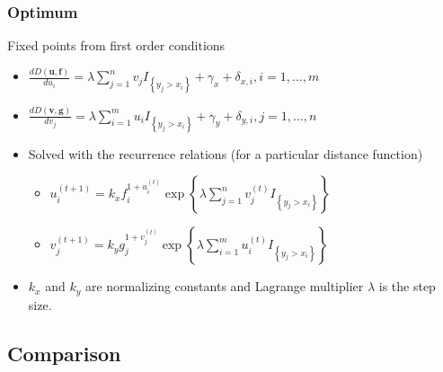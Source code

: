 \documentclass{beamer}
\begin{document}

\begin{frame}
\frametitle{Optimum}

Fixed points from first order conditions
\begin{itemize}
    \item $\frac{d D(\mathbf{u},\mathbf{f})}{d u_i} = \lambda \sum_{j = 1}^{n} v_j I_{\left\{ y_j > x_i \right\}} + \gamma_x + \delta_{x,i},
    i = 1, \dots, m$
    \item $\frac{d D(\mathbf{v},\mathbf{g})}{d v_j} = \lambda \sum_{i = 1}^{m} u_i I_{\left\{ y_j > x_i \right\}} + \gamma_y + \delta_{y,i},
    j = 1, \dots, n$
    \item Solved with the recurrence relations (for a particular distance function)
    \begin{itemize}
        \item $u_i^{(t+1)} = k_x f_i ^{1 + u_i^{(t)}}
                \exp{ \left\{ \lambda \sum_{j = 1}^{n} v_j^{(t)} I_{\left\{ y_j > x_i \right\}} \right\} }$
        \item $v_j^{(t+1)} = k_y g_j ^{1 + v_j^{(t)}}
                \exp{ \left\{ \lambda \sum_{i = 1}^{m} u_i^{(t)} I_{\left\{ y_j > x_i \right\}}  \right\} }$
    \end{itemize}
    \item $k_x$ and $k_y$ are normalizing constants and Lagrange multiplier $\lambda$ is the step size.
\end{itemize}

\end{frame}



\subsection{Comparison}


\end{document}
